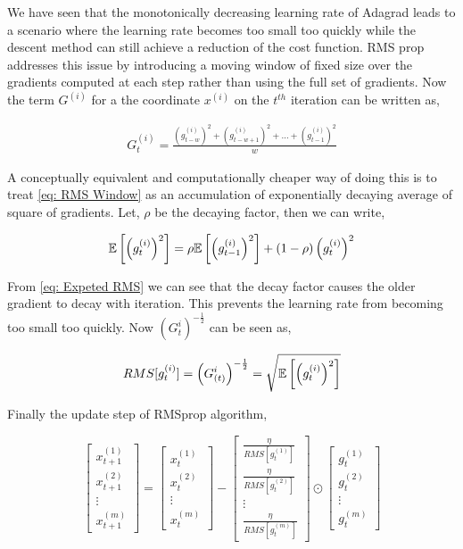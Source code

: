 We have seen that the monotonically decreasing learning rate of Adagrad leads to a scenario where the learning rate becomes too small too quickly while the descent method can still achieve a reduction of the cost function. RMS prop addresses this issue by introducing a moving  window of fixed size over the gradients computed at each step rather than using the full set of gradients. Now the term $G^{(i)}$ for a the coordinate $x^{(i)}$ on the $t^{th}$ iteration can be written as,

\begin{align}
    \label{eq: RMS Window}
    G_t^{(i)} = \frac{\left(g^{(i)}_{t-w}\right)^2+\left(g^{(i)}_{t-w+1}\right)^2+\hdots + \left(g^{(i)}_{t-1}\right)^2}{w}  
\end{align}

A conceptually equivalent and computationally cheaper way of doing this is to treat \ref{eq: RMS Window} as an accumulation of exponentially decaying average of square of gradients. Let, $\rho$ be the decaying factor, then we can write,

\begin{align}
\label{eq: Expeted RMS}
\mathbb{E} \left[ \left(g^{(i)}_{t}\right)^2 \right] = \rho \mathbb{E} \left[ \left(g^{(i)}_{t-1}\right)^2 \right] + (1-\rho) \left(g^{(i)}_{t}\right)^2 
\end{align}

From \ref{eq: Expeted RMS} we can see that the decay factor causes the older gradient to decay with iteration. This prevents the learning rate from becoming too small too quickly. Now $\left(G_t^{i}\right)^{-\frac{1}{2}}$ can be seen as,

\begin{align}
    \label{eq: RMS RMSprop}
    RMS[g_t^{(i)}] = \left(G_{(t)}^{i}\right)^{-\frac{1}{2}} = \sqrt{\mathbb{E} \left[ \left(g^{(i)}_{t}\right)^2 \right]}
\end{align}

Finally the update step of RMSprop algorithm, 


\[
\begin{bmatrix}
x^{(1)}_{t+1} \\
x^{(2)}_{t+1} \\
\vdots \\
x^{(m)}_{t+1}
\end{bmatrix}
=
\begin{bmatrix}
x^{(1)}_{t} \\
x^{(2)}_{t} \\
\vdots \\
x^{(m)}_{t}
\end{bmatrix}
-
\begin{bmatrix}
\frac{\eta}{RMS[g_t^{(1)}]}\\
 \frac{\eta}{RMS[g_t^{(2)}]}  \\
 \vdots\\
 \frac{\eta}{RMS[g_t^{(m)}]}
\end{bmatrix}
\odot 
\begin{bmatrix}
g^{(1)}_t \\
g^{(2)}_t \\
\vdots \\
g^{(m)}_t
\end{bmatrix}
\]
